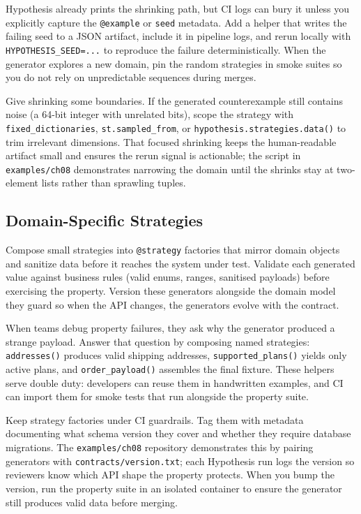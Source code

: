Hypothesis already prints the shrinking path, but CI logs can bury it unless you explicitly capture the \texttt{@example} or \texttt{seed} metadata. Add a helper that writes the failing seed to a JSON artifact, include it in pipeline logs, and rerun locally with \texttt{HYPOTHESIS\_SEED=...} to reproduce the failure deterministically. When the generator explores a new domain, pin the random strategies in smoke suites so you do not rely on unpredictable sequences during merges.

Give shrinking some boundaries. If the generated counterexample still contains noise (a 64-bit integer with unrelated bits), scope the strategy with \texttt{fixed\_dictionaries}, \texttt{st.sampled\_from}, or \texttt{hypothesis.strategies.data()} to trim irrelevant dimensions. That focused shrinking keeps the human-readable artifact small and ensures the rerun signal is actionable; the script in \texttt{examples/ch08} demonstrates narrowing the domain until the shrinks stay at two-element lists rather than sprawling tuples.

\subsection{Domain-Specific Strategies}
Compose small strategies into \texttt{@strategy} factories that mirror domain objects and sanitize data before it reaches the system under test. Validate each generated value against business rules (valid enums, ranges, sanitised payloads) before exercising the property. Version these generators alongside the domain model they guard so when the API changes, the generators evolve with the contract.

When teams debug property failures, they ask why the generator produced a strange payload. Answer that question by composing named strategies: \texttt{addresses()} produces valid shipping addresses, \texttt{supported\_plans()} yields only active plans, and \texttt{order\_payload()} assembles the final fixture. These helpers serve double duty: developers can reuse them in handwritten examples, and CI can import them for smoke tests that run alongside the property suite.

Keep strategy factories under CI guardrails. Tag them with metadata documenting what schema version they cover and whether they require database migrations. The \texttt{examples/ch08} repository demonstrates this by pairing generators with \texttt{contracts/version.txt}; each Hypothesis run logs the version so reviewers know which API shape the property protects. When you bump the version, run the property suite in an isolated container to ensure the generator still produces valid data before merging.

